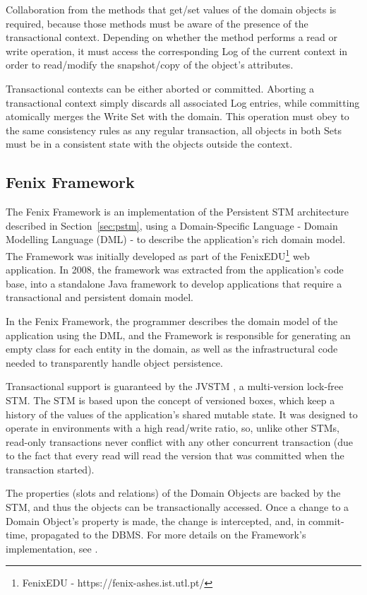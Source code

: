 \documentclass{llncs}
\begin{document}
Collaboration from the methods that get/set values of the domain
objects is required, because those methods must be aware of the presence
of the transactional context. Depending on whether the method performs
a read or write operation, it must access the corresponding Log of the
current context in order to read/modify the snapshot/copy of the
object's attributes.

Transactional contexts can be either aborted or committed. Aborting a
transactional context simply discards all associated Log entries,
while committing atomically merges the Write Set with the domain. This
operation must obey to the same consistency rules as any regular
transaction, all objects in both Sets must be in a consistent state
with the objects outside the context.

\subsection{Fenix Framework}

The Fenix Framework \cite{fernandes2011strict} is an implementation of
the Persistent STM architecture described in Section~\ref{sec:pstm},
using a Domain-Specific Language - Domain Modelling Language (DML)
\cite{cachopo2007development} - to describe the application's rich
domain model. The Framework was initially developed as part of the
FenixEDU\footnote{FenixEDU - https://fenix-ashes.ist.utl.pt/} web
application. In 2008, the framework was extracted from the
application's code base, into a standalone Java framework to develop
applications that require a transactional and persistent domain model.

In the Fenix Framework, the programmer describes the domain model of
the application using the DML, and the Framework is responsible for
generating an empty class for each entity in the domain, as well as
the infrastructural code needed to transparently handle object
persistence.

Transactional support is guaranteed by the JVSTM
\cite{cachopo2006versioned}, a multi-version lock-free STM. The STM is
based upon the concept of versioned boxes, which keep a history of the
values of the application's shared mutable state. It was designed to
operate in environments with a high read/write ratio, so, unlike other
STMs, read-only transactions never conflict with any other concurrent
transaction (due to the fact that every read will read the version
that was committed when the transaction started).

The properties (slots and relations) of the Domain Objects are backed
by the STM, and thus the objects can be transactionally accessed. Once
a change to a Domain Object's property is made, the change is
intercepted, and, in commit-time, propagated to the DBMS. For more
details on the Framework's implementation, see
\cite{fernandes2011strict}.
\end{document}
